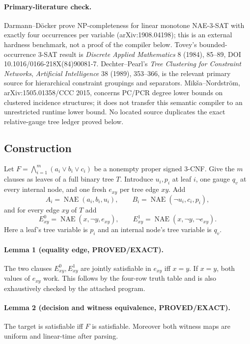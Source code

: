 \paragraph{Primary-literature check.}
Darmann--D\"ocker prove NP-completeness for linear monotone NAE-3-SAT with
exactly four occurrences per variable (arXiv:1908.04198); this is an external
hardness benchmark, not a proof of the compiler below.  Tovey's bounded-
occurrence 3-SAT result is \emph{Discrete Applied Mathematics} 8 (1984),
85--89, DOI 10.1016/0166-218X(84)90081-7.  Dechter--Pearl's
\emph{Tree Clustering for Constraint Networks}, \emph{Artificial
Intelligence} 38 (1989), 353--366, is the relevant primary source for
hierarchical constraint groupings and separators.  Mik\v{s}a--Nordstr\"om,
arXiv:1505.01358/CCC 2015, concerns PC/PCR degree lower bounds on clustered
incidence structures; it does not transfer this semantic compiler to an
unrestricted runtime lower bound.  No located source duplicates the exact
relative-gauge tree ledger proved below.

\subsection*{Construction}
Let $F=\bigwedge_{i=1}^m(a_i\vee b_i\vee c_i)$ be a nonempty proper signed
3-CNF.  Give the $m$ clauses as leaves of a full binary tree $T$.  Introduce
$u_i,p_i$ at leaf $i$, one gauge $q_v$ at every internal node, and one fresh
$e_{xy}$ per tree edge $xy$.  Add
\[
 A_i=\operatorname{NAE}(a_i,b_i,u_i),\qquad
 B_i=\operatorname{NAE}(\neg u_i,c_i,p_i),
\]
and for every edge $xy$ of $T$ add
\[
 E^0_{xy}=\operatorname{NAE}(x,\neg y,e_{xy}),\qquad
 E^1_{xy}=\operatorname{NAE}(x,\neg y,\neg e_{xy}).
\]
Here a leaf's tree variable is $p_i$ and an internal node's tree variable is
$q_v$.

\paragraph{Lemma 1 (equality edge, PROVED/EXACT).}
The two clauses $E^0_{xy},E^1_{xy}$ are jointly satisfiable in $e_{xy}$ iff
$x=y$.  If $x=y$, both values of $e_{xy}$ work.  This follows by the four-row
truth table and is also exhaustively checked by the attached program.

\paragraph{Lemma 2 (decision and witness equivalence, PROVED/EXACT).}
The target is satisfiable iff $F$ is satisfiable.  Moreover both witness maps
are uniform and linear-time after parsing.

